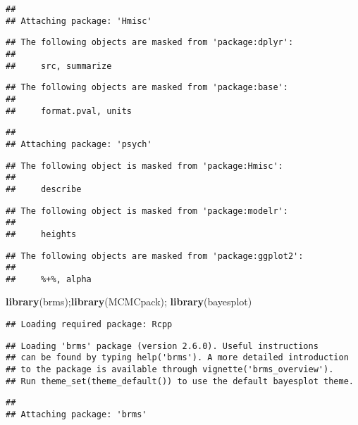 \documentclass[]{article}
\newenvironment{Shaded}{\begin{snugshade}}{\end{snugshade}}
\newcommand{\KeywordTok}[1]{\textcolor[rgb]{0.13,0.29,0.53}{\textbf{#1}}}
\newcommand{\NormalTok}[1]{#1}
\begin{document}
\begin{verbatim}
## 
## Attaching package: 'Hmisc'
\end{verbatim}

\begin{verbatim}
## The following objects are masked from 'package:dplyr':
## 
##     src, summarize
\end{verbatim}

\begin{verbatim}
## The following objects are masked from 'package:base':
## 
##     format.pval, units
\end{verbatim}

\begin{verbatim}
## 
## Attaching package: 'psych'
\end{verbatim}

\begin{verbatim}
## The following object is masked from 'package:Hmisc':
## 
##     describe
\end{verbatim}

\begin{verbatim}
## The following object is masked from 'package:modelr':
## 
##     heights
\end{verbatim}

\begin{verbatim}
## The following objects are masked from 'package:ggplot2':
## 
##     %+%, alpha
\end{verbatim}

\begin{Shaded}
\begin{Highlighting}[]
\KeywordTok{library}\NormalTok{(brms);}\KeywordTok{library}\NormalTok{(MCMCpack); }\KeywordTok{library}\NormalTok{(bayesplot)}
\end{Highlighting}
\end{Shaded}

\begin{verbatim}
## Loading required package: Rcpp
\end{verbatim}

\begin{verbatim}
## Loading 'brms' package (version 2.6.0). Useful instructions
## can be found by typing help('brms'). A more detailed introduction
## to the package is available through vignette('brms_overview').
## Run theme_set(theme_default()) to use the default bayesplot theme.
\end{verbatim}

\begin{verbatim}
## 
## Attaching package: 'brms'
\end{verbatim}
\end{document}
